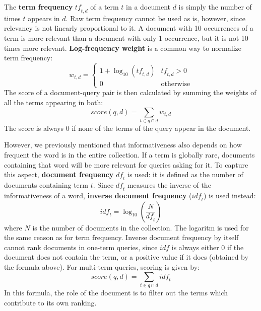 The \textbf{term frequency} $\textit{tf}_{t,d}$ of a term $t$ in a document $d$ is simply the number of times $t$ appears in $d$. Raw term frequency cannot be used as is, however, since relevancy is not linearly proportional to it. A document with 10 occurrences of a term is more relevant than a document with only 1 occurrence, but it is not 10 times more relevant. \textbf{Log-frequency weight} is a common way to normalize term frequency:
\begin{equation*}
    w_{t,d} = \begin{cases}
        1 + \log_{10}(\textit{tf}_{t,d}) & \textit{tf}_{t,d} > 0 \\
        0 & \text{otherwise}
    \end{cases}
\end{equation*} 
The score of a document-query pair is then calculated by summing the weights of all the terms appearing in both:
\begin{equation*}
    \textit{score}(q,d) = \sum_{t \in q \cap d} w_{t,d}
\end{equation*}
The score is always 0 if none of the terms of the query appear in the document.

However, we previously mentioned that informativeness also depends on how frequent the word is in the entire collection. If a term is globally rare, documents containing that word will be more relevant for queries asking for it. To capture this aspect, \textbf{document frequency} $\textit{df}_t$ is used: it is defined as the number of documents containing term $t$. Since $\textit{df}_t$ measures the inverse of the informativeness of a word, \textbf{inverse document frequency} ($\textit{idf}_t$) is used instead:
\begin{equation*}
    \textit{idf}_t = \log_{10} \left(\frac{N}{\textit{df}_t}\right)
\end{equation*}
where $N$ is the number of documents in the collection. The logaritm is used for the same reason as for term frequency. Inverse document frequency by itself cannot rank documents in one-term queries, since $\textit{idf}$ is always either 0 if the document does not contain the term, or a positive value if it does (obtained by the formula above). For multi-term queries, scoring is given by:
\begin{equation*}
    \textit{score}(q,d) = \sum_{t \in q \cap d} \textit{idf}_t
\end{equation*}
In this formula, the role of the document is to filter out the terms which contribute to its own ranking.

